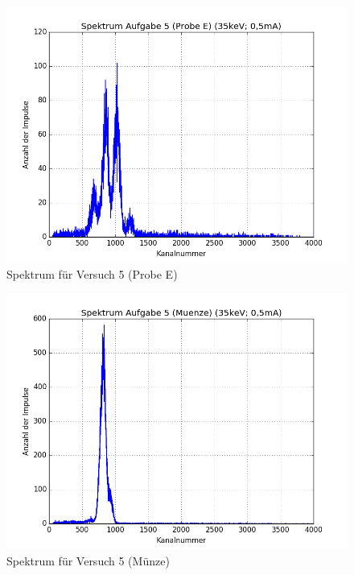 \begin{figure}[h]
 \centering
 \includegraphics[scale=0.7]{./fig/a5_spece.png}
 \caption{Spektrum für Versuch 5 (Probe E)}
 \label{fig:spek4e}
\end{figure}

\begin{figure}[h]
 \centering
 \includegraphics[scale=0.7]{./fig/a5_specm.png}
 \caption{Spektrum für Versuch 5 (Münze)}
 \label{fig:spek4m}
\end{figure}


